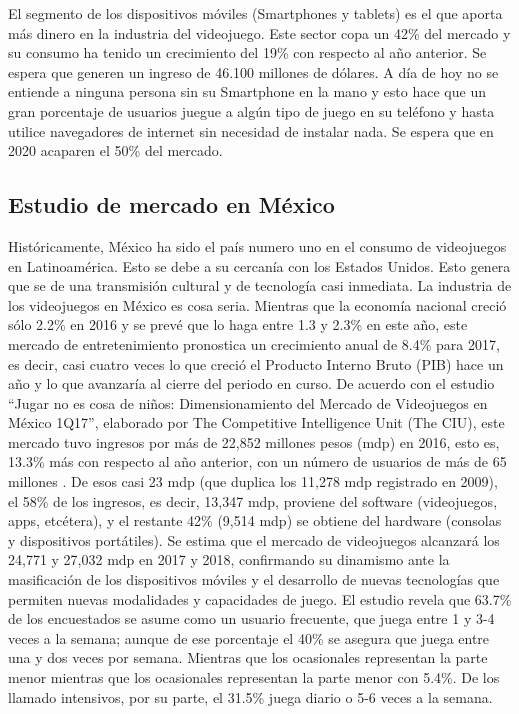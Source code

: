 			 El segmento de los dispositivos móviles (Smartphones y tablets) es el que aporta más dinero en la industria del videojuego. Este sector copa un 42\% del mercado y su consumo ha tenido un crecimiento del 19\% con respecto al año anterior. Se espera que generen un ingreso de 46.100 millones de dólares. A día de hoy no se entiende a ninguna persona sin su Smartphone en la mano y esto hace que un gran porcentaje de usuarios juegue a algún tipo de juego en su teléfono y hasta utilice navegadores de internet sin necesidad de instalar nada. Se espera que en 2020 acaparen el 50\% del mercado. \cite{vid01}
			 \\[1pt]
			 
\subsection{Estudio de mercado en México}

Históricamente, México ha sido el país numero uno en el consumo de videojuegos en Latinoamérica. Esto se debe a su cercanía con los Estados Unidos. Esto genera que se de una transmisión cultural y de tecnología casi inmediata. La industria de los videojuegos en México es cosa seria. Mientras que la economía nacional creció sólo 2.2\% en 2016 y se prevé que lo haga entre 1.3 y 2.3\% en este año, este mercado de entretenimiento pronostica un crecimiento anual de 8.4\% para 2017, es decir, casi cuatro veces lo que creció el Producto Interno Bruto (PIB) hace un año y lo que avanzaría al cierre del periodo en curso. De acuerdo con el estudio “Jugar no es cosa de niños: Dimensionamiento del Mercado de Videojuegos en México 1Q17”, elaborado por The Competitive Intelligence Unit (The CIU), este mercado tuvo ingresos por más de 22,852 millones pesos (mdp) en 2016, esto es, 13.3\% más con respecto al año anterior, con un número de usuarios de más de 65 millones \cite{vid03}. De esos casi 23 mdp (que duplica los 11,278 mdp registrado en 2009), el 58\% de los ingresos, es decir, 13,347 mdp, proviene del software (videojuegos, apps, etcétera), y el restante 42\% (9,514 mdp) se obtiene del hardware (consolas y dispositivos portátiles). Se estima que el mercado de videojuegos alcanzará los 24,771 y 27,032 mdp en 2017 y 2018, confirmando su dinamismo ante la masificación de los dispositivos móviles y el desarrollo de nuevas tecnologías que permiten nuevas modalidades y capacidades de juego. El estudio revela que 63.7\% de los encuestados se asume como un usuario frecuente, que juega entre 1 y 3-4 veces a la semana; aunque de ese porcentaje el 40\% se asegura que juega entre una y dos veces por semana. Mientras que los ocasionales representan la parte menor mientras que los ocasionales representan la parte menor con 5.4\%. De los llamado intensivos, por su parte, el 31.5\% juega diario o 5-6 veces a la semana.



